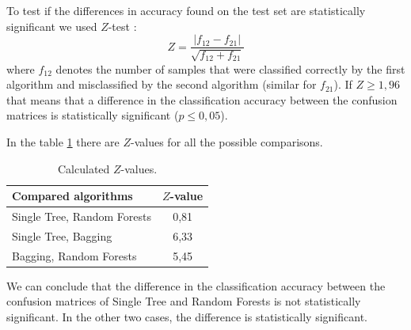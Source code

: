\documentclass[a4paper,11pt]{article}
\begin{document}
To test if the differences in accuracy found on the test set are statistically significant we used $Z$-test \cite{accuracy}:
\[
Z = \frac{|f_{12} - f_{21}|}{\sqrt{f_{12} + f_{21}}}
\]
where $f_{12}$ denotes the number of samples that were classified correctly by the first algorithm and misclassified by the second algorithm (similar for $f_{21}$). If $Z \geq 1{,}96$ that means that a difference in the classification accuracy between the confusion matrices is statistically significant ($p \leq 0{,}05$).

In the table \ref{tab: z} there are $Z$-values for all the possible comparisons.
\begin{table}[h!]
\centering
	\begin{tabular}{l||c}
	Compared algorithms & $Z$-value   \\ \hline \hline
	Single Tree, Random Forests & 0{,}81 \\ \hline
	Single Tree, Bagging &  6{,}33 \\ \hline
	Bagging, Random Forests & 5{,}45
	\end{tabular}
	\caption{Calculated $Z$-values.}
	\label{tab: z}
\end{table}

We can conclude that the difference in the classification accuracy between the confusion matrices of Single Tree and Random Forests is not statistically significant. In the other two cases, the difference is statistically significant.



\end{document}
